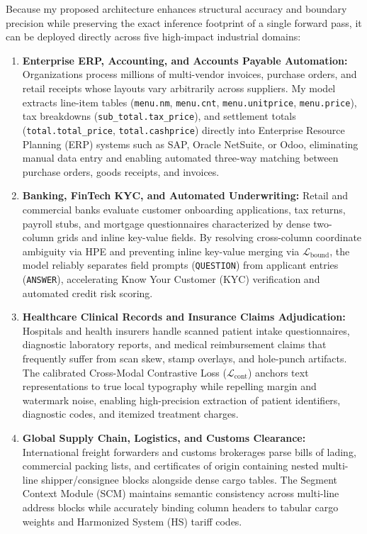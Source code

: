 Because my proposed architecture enhances structural accuracy and boundary precision while preserving the exact inference footprint of a single forward pass, it can be deployed directly across five high-impact industrial domains:

\begin{enumerate}
    \item \textbf{Enterprise ERP, Accounting, and Accounts Payable Automation:}
    Organizations process millions of multi-vendor invoices, purchase orders, and retail receipts whose layouts vary arbitrarily across suppliers. My model extracts line-item tables (\texttt{menu.nm}, \texttt{menu.cnt}, \texttt{menu.unitprice}, \texttt{menu.price}), tax breakdowns (\texttt{sub\_total.tax\_price}), and settlement totals (\texttt{total.total\_price}, \texttt{total.cashprice}) directly into Enterprise Resource Planning (ERP) systems such as SAP, Oracle NetSuite, or Odoo, eliminating manual data entry and enabling automated three-way matching between purchase orders, goods receipts, and invoices.

    \item \textbf{Banking, FinTech KYC, and Automated Underwriting:}
    Retail and commercial banks evaluate customer onboarding applications, tax returns, payroll stubs, and mortgage questionnaires characterized by dense two-column grids and inline key-value fields. By resolving cross-column coordinate ambiguity via HPE and preventing inline key-value merging via $\mathcal{L}_{\text{bound}}$, the model reliably separates field prompts (\texttt{QUESTION}) from applicant entries (\texttt{ANSWER}), accelerating Know Your Customer (KYC) verification and automated credit risk scoring.

    \item \textbf{Healthcare Clinical Records and Insurance Claims Adjudication:}
    Hospitals and health insurers handle scanned patient intake questionnaires, diagnostic laboratory reports, and medical reimbursement claims that frequently suffer from scan skew, stamp overlays, and hole-punch artifacts. The calibrated Cross-Modal Contrastive Loss ($\mathcal{L}_{\text{cont}}$) anchors text representations to true local typography while repelling margin and watermark noise, enabling high-precision extraction of patient identifiers, diagnostic codes, and itemized treatment charges.

    \item \textbf{Global Supply Chain, Logistics, and Customs Clearance:}
    International freight forwarders and customs brokerages parse bills of lading, commercial packing lists, and certificates of origin containing nested multi-line shipper/consignee blocks alongside dense cargo tables. The Segment Context Module (SCM) maintains semantic consistency across multi-line address blocks while accurately binding column headers to tabular cargo weights and Harmonized System (HS) tariff codes.


\end{enumerate}
